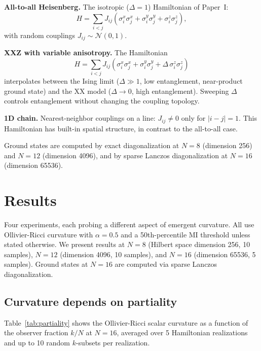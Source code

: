 \documentclass[aps,pra,twocolumn,superscriptaddress]{revtex4-2}
\begin{document}
\textbf{All-to-all Heisenberg.} The isotropic ($\Delta = 1$) Hamiltonian of Paper~I:
\begin{equation}
H = \sum_{i < j} J_{ij}\left(\sigma^x_i \sigma^x_j + \sigma^y_i \sigma^y_j + \sigma^z_i \sigma^z_j\right),
\end{equation}
with random couplings $J_{ij} \sim \mathcal{N}(0,1)$.

\textbf{XXZ with variable anisotropy.} The Hamiltonian
\begin{equation}
H = \sum_{i<j} J_{ij}\left(\sigma^x_i \sigma^x_j + \sigma^y_i \sigma^y_j + \Delta\, \sigma^z_i \sigma^z_j\right)
\label{eq:xxz}
\end{equation}
interpolates between the Ising limit ($\Delta \gg 1$, low entanglement, near-product ground state) and the XX model ($\Delta \to 0$, high entanglement). Sweeping $\Delta$ controls entanglement without changing the coupling topology.

\textbf{1D chain.} Nearest-neighbor couplings on a line: $J_{ij} \neq 0$ only for $|i - j| = 1$. This Hamiltonian has built-in spatial structure, in contrast to the all-to-all case.

Ground states are computed by exact diagonalization at $N = 8$ (dimension 256) and $N = 12$ (dimension 4096), and by sparse Lanczos diagonalization at $N = 16$ (dimension 65536).


\section{Results}
\label{sec:results}

Four experiments, each probing a different aspect of emergent curvature. All use Ollivier-Ricci curvature with $\alpha = 0.5$ and a 50th-percentile MI threshold unless stated otherwise. We present results at $N = 8$ (Hilbert space dimension 256, 10 samples), $N = 12$ (dimension 4096, 10 samples), and $N = 16$ (dimension 65536, 5 samples). Ground states at $N = 16$ are computed via sparse Lanczos diagonalization.


\subsection{Curvature depends on partiality}

Table~\ref{tab:partiality} shows the Ollivier-Ricci scalar curvature as a function of the observer fraction $k/N$ at $N = 16$, averaged over 5 Hamiltonian realizations and up to 10 random $k$-subsets per realization.
\end{document}

